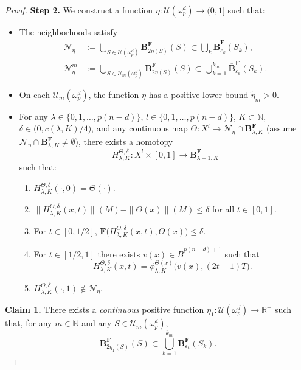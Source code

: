 \documentclass[10pt,a4paper]{amsart}
\begin{document}
\begin{proof}
\textbf{Step 2.} We construct a function \(\eta:\mathcal{U}(\omega^d_p)\to(0,1]\) such that:
\begin{itemize}
    \item The neighborhoods satisfy
    \[
    \begin{aligned}
    \mathcal N_\eta &:= \bigcup_{S\in\mathcal U(\omega^d_p)} \mathbf B^\mathbf{F}_{2\eta(S)}(S)
    \subset \bigcup_{k} \overline{\mathbf B}^\mathbf{F}_{\varepsilon_k}(S_k),\\
    \mathcal N^m_\eta &:= \bigcup_{S\in\mathcal U_m(\omega^d_p)} \mathbf B^\mathbf{F}_{2\eta(S)}(S)
    \subset \bigcup_{k=1}^{k_m} \overline{ \mathbf B}^\mathbf{F}_{\varepsilon_k}(S_k).
    \end{aligned}
    \]
    \item On each \(\mathcal{U}_m(\omega^d_p)\), the function \(\eta\) has a positive lower bound \(\tilde\eta_m>0\).
    \item For any \(\lambda\in\{0,1,\dots,p(n-d)\}\), \(l\in\{0,1,\dots,p(n-d)\}\), \(K\subset\mathbb{N}\), \(\delta\in\bigl(0,c(\lambda,K)/4\bigr)\), and any continuous map \(\Theta:X^l\to \mathcal{N}_\eta\cap \mathbf{B}^\mathbf{F}_{\lambda,K}\) (assume \(\mathcal{N}_\eta\cap \mathbf{B}^\mathbf{F}_{\lambda,K}\neq\emptyset\)), there exists a homotopy
    \[
        H^{\Theta,\delta}_{\lambda,K}:X^l\times[0,1]\to \mathbf{B}^\mathbf{F}_{\lambda+1,K}
    \]
    such that:
    \begin{enumerate}
        \item \(H^{\Theta,\delta}_{\lambda,K}(\cdot,0)=\Theta(\cdot)\).
        \item \(\|H^{\Theta,\delta}_{\lambda,K}(x,t)\|(M)-\|\Theta(x)\|(M)\le \delta\) for all \(t\in[0,1]\).
        \item For \(t\in[0,1/2]\), \(\mathbf{F}\bigl(H^{\Theta,\delta}_{\lambda,K}(x,t),\Theta(x)\bigr)\le \delta\).
        \item For \(t\in[1/2,1]\) there exists \(v(x)\in\overline{B}^{p(n-d)+1}\) such that
        \begin{equation}\label{eq:flow}
            H^{\Theta,\delta}_{\lambda,K}(x,t)=\phi^{\Theta(x)}_{\lambda,K}\bigl(v(x),(2t-1)T\bigr).
        \end{equation}
        \item \(H^{\Theta,\delta}_{\lambda,K}(\cdot,1)\notin \mathcal{N}_\eta\).
    \end{enumerate}
\end{itemize}
        
\textbf{Claim 1.} There exists a \emph{continuous} positive function \(\eta_1:\mathcal{U}(\omega^d_p)\to\mathbb{R}^+\) such that, for any \(m\in\mathbb{N}\) and any \(S\in\mathcal{U}_m(\omega^d_p)\),
\[
    \mathbf{B}^\mathbf{F}_{2\eta_1(S)}(S)\subset \bigcup_{k=1}^{k_m}\mathbf{B}^\mathbf{F}_{\varepsilon_k}(S_k).
\]


\end{proof}
\end{document}

